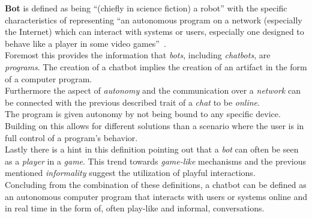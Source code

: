 \textbf{Bot} is defined as being ``(chiefly in science fiction) a robot'' with the specific characteristics of representing ``an autonomous program on a network (especially the Internet) which can interact with systems or users, especially one designed to behave like a player in some video games''~\cite{oxfordbot}.
\\
Foremost this provides the information that \emph{bots}, including \emph{chatbots}, are \emph{programs}.
The creation of a chatbot implies the creation of an artifact in the form of a computer program.
\\
Furthermore the aspect of \emph{autonomy} and the communication over a \emph{network} can be connected with the previous described trait of a \emph{chat} to be \emph{online}.
\\
The program is given autonomy by not being bound to any specific device.
Building on this allows for different solutions than a scenario where the user is in full control of a program's behavior.
\\
Lastly there is a hint in this definition pointing out that a \emph{bot} can often be seen as a \emph{player} in a \emph{game}.
This trend towards \emph{game-like} mechanisms and the previous mentioned \emph{informality} suggest the utilization of playful interactions.
\\

Concluding from the combination of these definitions, a chatbot can be defined as an autonomous computer program that interacts with users or systems online and in real time in the form of, often play-like and informal, conversations.
